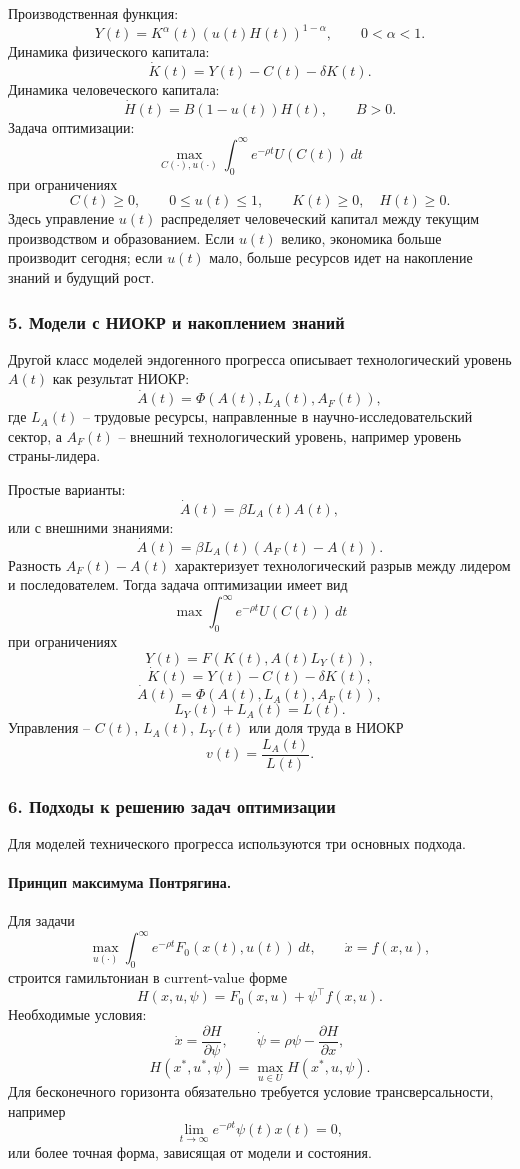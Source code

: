 \documentclass[12pt,a4paper]{article}
\begin{document}
Производственная функция:
\[
Y(t)=K^\alpha(t)(u(t)H(t))^{1-\alpha},\qquad 0<\alpha<1.
\]
Динамика физического капитала:
\[
\dot K(t)=Y(t)-C(t)-\delta K(t).
\]
Динамика человеческого капитала:
\[
\dot H(t)=B(1-u(t))H(t),\qquad B>0.
\]
Задача оптимизации:
\[
\max_{C(\cdot),u(\cdot)}\int_0^\infty e^{-\rho t}U(C(t))\,dt
\]
при ограничениях
\[
C(t)\ge 0,\qquad 0\le u(t)\le 1,\qquad K(t)\ge 0,\quad H(t)\ge 0.
\]
Здесь управление $u(t)$ распределяет человеческий капитал между текущим производством и образованием. Если $u(t)$ велико, экономика больше производит сегодня; если $u(t)$ мало, больше ресурсов идет на накопление знаний и будущий рост.

\subsubsection*{5. Модели с НИОКР и накоплением знаний}
Другой класс моделей эндогенного прогресса описывает технологический уровень $A(t)$ как результат НИОКР:
\[
\dot A(t)=\Phi(A(t),L_A(t),A_F(t)),
\]
где $L_A(t)$ -- трудовые ресурсы, направленные в научно-исследовательский сектор, а $A_F(t)$ -- внешний технологический уровень, например уровень страны-лидера.

Простые варианты:
\[
\dot A(t)=\beta L_A(t)A(t),
\]
или с внешними знаниями:
\[
\dot A(t)=\beta L_A(t)(A_F(t)-A(t)).
\]
Разность $A_F(t)-A(t)$ характеризует технологический разрыв между лидером и последователем. Тогда задача оптимизации имеет вид
\[
\max \int_0^\infty e^{-\rho t}U(C(t))\,dt
\]
при ограничениях
\[
Y(t)=F(K(t),A(t)L_Y(t)),
\]
\[
\dot K(t)=Y(t)-C(t)-\delta K(t),
\]
\[
\dot A(t)=\Phi(A(t),L_A(t),A_F(t)),
\]
\[
L_Y(t)+L_A(t)=L(t).
\]
Управления -- $C(t)$, $L_A(t)$, $L_Y(t)$ или доля труда в НИОКР
\[
v(t)=\frac{L_A(t)}{L(t)}.
\]

\subsubsection*{6. Подходы к решению задач оптимизации}
Для моделей технического прогресса используются три основных подхода.

\paragraph{Принцип максимума Понтрягина.}
Для задачи
\[
\max_{u(\cdot)}\int_0^\infty e^{-\rho t}F_0(x(t),u(t))\,dt,
\qquad \dot x=f(x,u),
\]
строится гамильтониан в current-value форме
\[
H(x,u,\psi)=F_0(x,u)+\psi^\top f(x,u).
\]
Необходимые условия:
\[
\dot x=\frac{\partial H}{\partial \psi},\qquad
\dot\psi=\rho\psi-\frac{\partial H}{\partial x},
\]
\[
H(x^*,u^*,\psi)=\max_{u\in U}H(x^*,u,\psi).
\]
Для бесконечного горизонта обязательно требуется условие трансверсальности, например
\[
\lim_{t\to\infty}e^{-\rho t}\psi(t)x(t)=0,
\]
или более точная форма, зависящая от модели и состояния.
\end{document}
